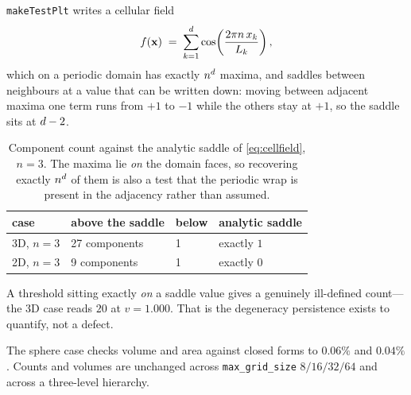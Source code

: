 \texttt{makeTestPlt} writes a cellular field
\begin{equation}
  f(\mathbf{x}) \;=\; \sum_{k=1}^{d} \cos\!\left(\frac{2\pi n\,x_k}{L_k}\right),
  \label{eq:cellfield}
\end{equation}
which on a periodic domain has exactly $n^{d}$ maxima, and saddles between
neighbours at a value that can be written down: moving between adjacent maxima
one term runs from $+1$ to $-1$ while the others stay at $+1$, so the saddle sits
at $d - 2$.

\begin{table}[htbp]
\centering
\caption{Component count against the analytic saddle of \cref{eq:cellfield},
  $n=3$. The maxima lie \emph{on} the domain faces, so recovering exactly
  $n^{d}$ of them is also a test that the periodic wrap is present in the
  adjacency rather than assumed.}
\label{tab:cellcounts}
\begin{tabular}{llll}
\toprule
case & above the saddle & below & analytic saddle \\
\midrule
3D, $n=3$ & 27 components & 1 & exactly $1$ \\
2D, $n=3$ &  9 components & 1 & exactly $0$ \\
\bottomrule
\end{tabular}
\end{table}

A threshold sitting exactly \emph{on} a saddle value gives a genuinely
ill-defined count---the 3D case reads $20$ at $v = 1.000$. That is the
degeneracy persistence exists to quantify, not a defect.

The sphere case checks volume and area against closed forms to $0.06\%$ and
$0.04\%$. Counts and volumes are unchanged across \texttt{max\_grid\_size}
$8/16/32/64$ and across a three-level hierarchy.
